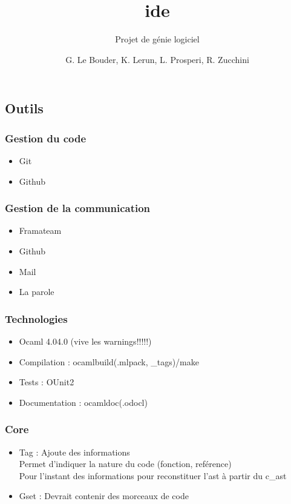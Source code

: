 \documentclass{beamer}
\title{ide}
\subtitle{Projet de génie logiciel}
\author{G. Le Bouder, K. Lerun, L. Prosperi, R. Zucchini}
\begin{document}
\maketitle

\begin{frame}
    \section{Outils}
    \frametitle{Gestion du code}

    \begin{itemize}
        \item Git
        \item Github
    \end{itemize}
\end{frame}

\begin{frame}
    \frametitle{Gestion de la communication}

    \begin{itemize}
        \item Framateam
        \item Github
        \item Mail
        \item La parole
    \end{itemize}
\end{frame}

\begin{frame}
    \frametitle{Technologies}

    \begin{itemize}
        \item Ocaml 4.04.0 (vive les warnings!!!!!)
        \item Compilation : ocamlbuild(.mlpack, \_tags)/make
        \item Tests : OUnit2
        \item Documentation : ocamldoc(.odocl)
    \end{itemize}
\end{frame}

\begin{frame}
    \frametitle{Core}

    \begin{itemize}
        \item Tag : Ajoute des informations \\
        Permet d'indiquer la nature du code (fonction, reférence) \\
        Pour l'instant des informations pour reconstituer l'ast à partir du c\_ast
        \item Gset : Devrait contenir des morceaux de code
    \end{itemize}
\end{frame}
\end{document}
